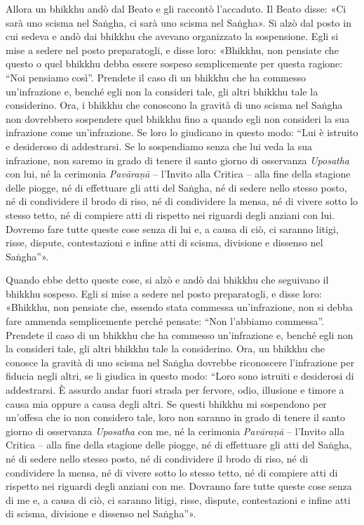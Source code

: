 Allora un bhikkhu andò dal Beato e gli raccontò l’accaduto. Il Beato disse: «Ci
sarà uno scisma nel Saṅgha, ci sarà uno scisma nel Saṅgha». Si alzò dal posto in
cui sedeva e andò dai bhikkhu che avevano organizzato la sospensione. Egli si
mise a sedere nel posto preparatogli, e disse loro: «Bhikkhu, non pensiate che
questo o quel bhikkhu debba essere sospeso semplicemente per questa ragione:
“Noi pensiamo così”. Prendete il caso di un bhikkhu che ha commesso
un’infrazione e, benché egli non la consideri tale, gli altri bhikkhu tale la
considerino. Ora, i bhikkhu che conoscono la gravità di uno scisma nel Saṅgha
non dovrebbero sospendere quel bhikkhu fino a quando egli non consideri la sua
infrazione come un’infrazione. Se loro lo giudicano in questo modo: “Lui è
istruito e desideroso di addestrarsi. Se lo sospendiamo senza che lui veda la
sua infrazione, non saremo in grado di tenere il santo giorno di osservanza
\emph{Uposatha} con lui, né la cerimonia \emph{Pavāraṇā} – l’Invito alla Critica
– alla fine della stagione delle piogge, né di effettuare gli atti del Saṅgha,
né di sedere nello stesso posto, né di condividere il brodo di riso, né di
condividere la mensa, né di vivere sotto lo stesso tetto, né di compiere atti di
rispetto nei riguardi degli anziani con lui. Dovremo fare tutte queste cose
senza di lui e, a causa di ciò, ci saranno litigi, risse, dispute, contestazioni
e infine atti di scisma, divisione e dissenso nel Saṅgha”».

Quando ebbe detto queste cose, si alzò e andò dai bhikkhu che seguivano il
bhikkhu sospeso. Egli si mise a sedere nel posto preparatogli, e disse loro:
«Bhikkhu, non pensiate che, essendo stata commessa un’infrazione, non si debba
fare ammenda semplicemente perché pensate: “Non l’abbiamo commessa”. Prendete il
caso di un bhikkhu che ha commesso un’infrazione e, benché egli non la consideri
tale, gli altri bhikkhu tale la considerino. Ora, un bhikkhu che conosce la
gravità di uno scisma nel Saṅgha dovrebbe riconoscere l’infrazione per fiducia
negli altri, se li giudica in questo modo: “Loro sono istruiti e desiderosi di
addestrarsi. È assurdo andar fuori strada per fervore, odio, illusione e timore
a causa mia oppure a causa degli altri. Se questi bhikkhu mi sospendono per
un’offesa che io non considero tale, loro non saranno in grado di tenere il
santo giorno di osservanza \emph{Uposatha} con me, né la cerimonia
\emph{Pavāraṇā} – l’Invito alla Critica – alla fine della stagione delle piogge,
né di effettuare gli atti del Saṅgha, né di sedere nello stesso posto, né di
condividere il brodo di riso, né di condividere la mensa, né di vivere sotto lo
stesso tetto, né di compiere atti di rispetto nei riguardi degli anziani con me.
Dovranno fare tutte queste cose senza di me e, a causa di ciò, ci saranno
litigi, risse, dispute, contestazioni e infine atti di scisma, divisione e
dissenso nel Saṅgha”».

